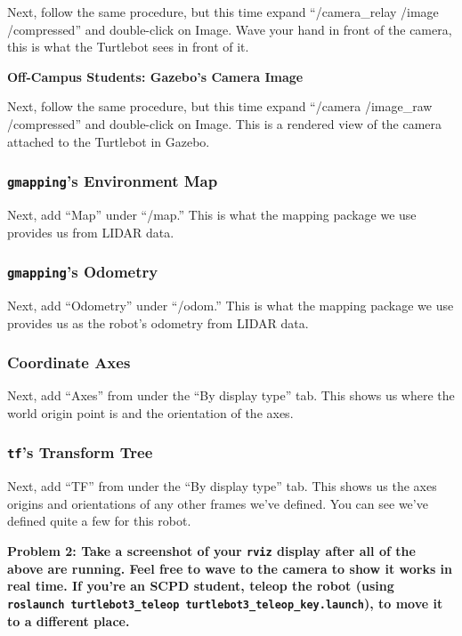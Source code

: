 \documentclass{article}
\begin{document}
Next, follow the same procedure, but this time expand ``/camera\_relay /image /compressed'' and double-click on Image. Wave your hand in front of the camera, this is what the Turtlebot sees in front of it.

\textbf{Off-Campus Students: Gazebo's Camera Image}

Next, follow the same procedure, but this time expand ``/camera /image\_raw /compressed'' and double-click on Image. This is a rendered view of the camera attached to the Turtlebot in Gazebo.

\subsubsection{\texttt{gmapping}'s Environment Map}

Next, add ``Map'' under ``/map.'' This is what the mapping package we use provides us from LIDAR data.

\subsubsection{\texttt{gmapping}'s Odometry}

Next, add ``Odometry'' under ``/odom.'' This is what the mapping package we use provides us as the robot's odometry from LIDAR data.

\subsubsection{Coordinate Axes}

Next, add ``Axes'' from under the ``By display type'' tab. This shows us where the world origin point is and the orientation of the axes.

\subsubsection{\texttt{tf}'s Transform Tree}

Next, add ``TF'' from under the ``By display type'' tab. This shows us the axes origins and orientations of any other frames we've defined. You can see we've defined quite a few for this robot.

{\bf Problem 2: Take a screenshot of your \texttt{rviz} display after all of the above are running. Feel free to wave to the camera to show it works in real time. If you're an SCPD student, teleop the robot (using \texttt{roslaunch turtlebot3\_teleop turtlebot3\_teleop\_key.launch}), to move it to a different place.}
\end{document}
